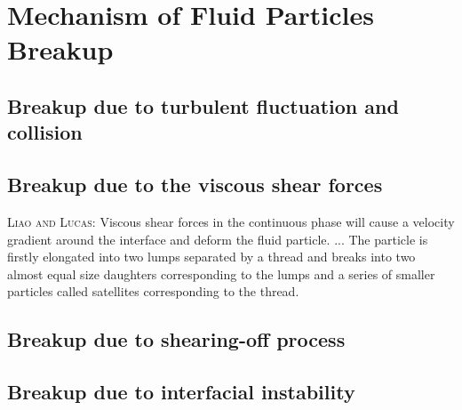 \section{Mechanism of Fluid Particles Breakup}

\subsection{Breakup due to turbulent fluctuation and collision}
\subsection{Breakup due to the viscous shear forces}
\textsc{Liao and Lucas}: Viscous shear forces in the continuous phase will cause a velocity gradient around the interface and deform the fluid particle. ... The particle is firstly elongated into two lumps separated by a thread and breaks into two almost equal size daughters corresponding to the lumps and a series of smaller particles called satellites corresponding to the thread.


\subsection{Breakup due to shearing-off process}
\subsection{Breakup due to interfacial instability}